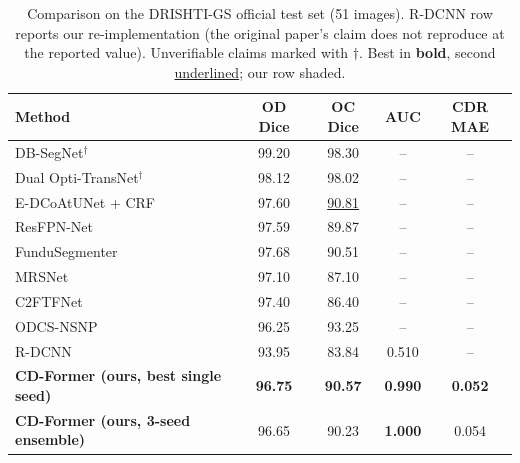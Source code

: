 

\begin{table}[t]
\centering
\caption{Comparison on the DRISHTI-GS official test set (51 images).
R-DCNN row reports our re-implementation (the original paper's claim does
not reproduce at the reported value). Unverifiable claims marked with $\dagger$.
Best in \textbf{bold}, second \underline{underlined}; our row shaded.}
\label{tab:drishti}
\setlength{\tabcolsep}{8pt}
\renewcommand{\arraystretch}{1.15}
\begin{tabular}{lcccc}
\toprule
\textbf{Method} & \textbf{OD Dice} & \textbf{OC Dice} & \textbf{AUC} & \textbf{CDR MAE} \\
\midrule
DB-SegNet$^\dagger$~\cite{dbsegnet2025}              & 99.20 & 98.30 & --    & --    \\
Dual Opti-TransNet$^\dagger$~\cite{dualoptitrans2026} & 98.12 & 98.02 & --    & --    \\
\midrule
E-DCoAtUNet + CRF~\cite{edcoatunet2025}              & 97.60 & \underline{90.81} & --    & --    \\
ResFPN-Net~\cite{resfpnnet2022}                       & 97.59 & 89.87 & --    & --    \\
FunduSegmenter~\cite{fundusegmenter2025}              & 97.68 & 90.51 & --    & --    \\
MRSNet~\cite{mrsnet2023}                              & 97.10 & 87.10 & --    & --    \\
C2FTFNet~\cite{c2ftfnet2023}                          & 97.40 & 86.40 & --    & --    \\
ODCS-NSNP~\cite{odcsnsnp2023}                         & 96.25 & 93.25 & --    & --    \\
R-DCNN~\cite{li2023rdcnn}                             & 93.95 & 83.84 & 0.510 & --    \\
\midrule
\rowcolor{ourrow}
\textbf{\textcolor{ourbold}{CD-Former (ours, best single seed)}} & \textbf{96.75} & \textbf{90.57} & \textbf{0.990} & \textbf{0.052} \\
\rowcolor{ourrow}
\textbf{\textcolor{ourbold}{CD-Former (ours, 3-seed ensemble)}} & 96.65 & 90.23 & \textbf{1.000} & 0.054 \\
\bottomrule
\end{tabular}
\end{table}


